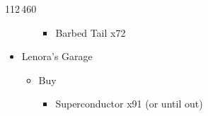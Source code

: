 \begin{shop}{112\,460}
\begin{multicols}{2}
\begin{itemize}
\begin{itemize}
\begin{itemize}
					            \item Barbed Tail x72
				            \end{itemize}
			      \end{itemize}
			\item Lenora's Garage
			      \begin{itemize}
				      \item Buy
				            \begin{itemize}
					            \item Superconductor x91 (or until out)
				            \end{itemize}
			      \end{itemize}
		\end{itemize}
	\end{multicols}
\end{shop}
